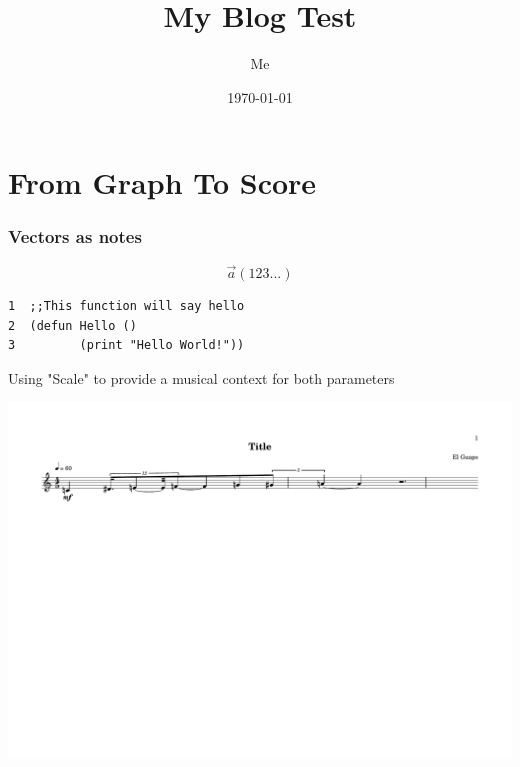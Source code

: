 \documentclass[11pt]{article}
\author{Me}
\date{\today}
\title{My Blog Test}
\begin{document}
\maketitle
\tableofcontents


\section{From Graph To Score}
\label{sec:org1b3cc40}



\subsubsection{Vectors as notes}
\label{sec:orgd5cb33b}
\begin{equation}                       
\vec{a}(1 2 3 ...)                             
\end{equation} 

\begin{verbatim}
1  ;;This function will say hello
2  (defun Hello ()
3         (print "Hello World!"))
\end{verbatim}

Using "Scale" to provide a musical context for both parameters 
\begin{center}
\includegraphics[width=.9\linewidth]{test.pdf}
\end{center}
\end{document}
